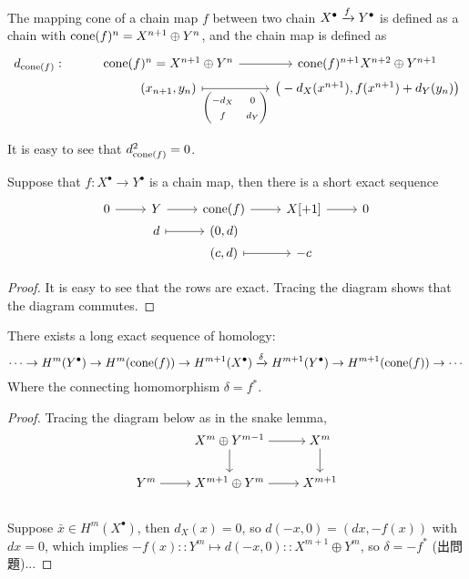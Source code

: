 \begin{definition}
  The {mapping cone} of a chain map $f$ between two chain $X^\bullet \xrightarrow{f} Y^\bullet$
  is defined as a chain with $\operatorname{cone}(f)^n = X^{n+1} \oplus Y^n$,
  and the chain map is defined as
  \[ \begin{tikzcd}[row sep=0, ampersand replacement=\&]
      d_{\cone(f)} : \& \cone(f)^n = X^{n+1} \oplus Y^n \ar[r] \& \cone(f)^{n+1} X^{n+2} \oplus Y^{n+1} \\
      \& (x_{n+1}, y_n) \ar[r, mapsto, "{\begin{pmatrix} -d_X & 0 \\ f & d_Y \end{pmatrix}}"']
      \& \big(-d_X(x^{n+1}), f(x^{n+1}) + d_Y(y_n)\big) \\
    \end{tikzcd} \]
\end{definition}

It is easy to see that $d_{\operatorname{cone}(f)}^2 = 0$.

\begin{prop}
  Suppose that $f : X^\bullet \to Y^\bullet$ is a chain map,
  then there is a short exact sequence
  \[ \begin{tikzcd}[row sep=0pt]
      0 \ar[r] & Y \ar[r] & \cone(f) \ar[r] & X[+1] \ar[r] & 0 \\
      & d \ar[mapsto, r] & (0, d) & & \\
      & & (c, d) \ar[mapsto, r] & -c & \\
    \end{tikzcd} \]

  \begin{proof}
    It is easy to see that the rows are exact.
    Tracing the diagram shows that the diagram commutes.
  \end{proof}
\end{prop}

\begin{coro}
  There exists a long exact sequence of homology:
  \[ \cdots \to H^{m}(Y^\bullet) \to H^{m}(\operatorname{cone}(f)) \to H^{m+1}(X^\bullet)
    \xrightarrow{\delta} H^{m+1}(Y^\bullet) \to H^{m+1}(\operatorname{cone}(f)) \to \cdots \]
  Where the connecting homomorphism $\delta = f^*$.

  \begin{proof}
    Tracing the diagram below as in the snake lemma,
    \[ \begin{tikzcd}[cramped]
        & X^{m} \oplus Y^{m-1} \ar[r] \ar[d] & X^{m} \ar[d] \\
        Y^{m} \ar[r] & X^{m+1} \oplus Y^{m} \ar[r]  & X^{m+1} \\
    \end{tikzcd} \]
  Suppose $\bar{x} \in H^m(X^\bullet)$, then $d_X(x) = 0$,
  so $d (-x, 0) = (dx, -f(x))$ with $dx = 0$, which implies
  $-f(x) :: Y^m \mapsto d (-x, 0) :: X^{m+1} \oplus Y^m$,
  so $\delta = -f^*$ (出問題)...
  \end{proof}
\end{coro}

